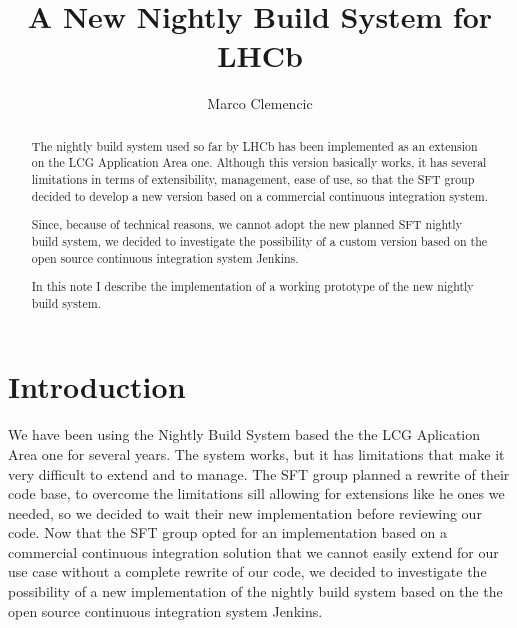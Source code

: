\documentclass{lhcbnote}
\title{A New Nightly Build System for LHCb}
\author{Marco Clemencic\address[MCl]{CERN, Switzerland}}
\begin{document}
\maketitle

\begin{abstract}
The nightly build system used so far by LHCb has been implemented as an
extension on the LCG Application Area one\cite{Kruzelecki:2010zz}.  Although
this version basically works, it has several limitations in terms of
extensibility, management, ease of use, so that the SFT group decided to develop
a new version based on a commercial continuous integration system.

Since, because of technical reasons, we cannot adopt the new planned SFT nightly
build system, we decided to investigate the possibility of a custom version
based on the open source continuous integration system Jenkins\cite{Jenkins}.

In this note I describe the implementation of a working prototype of the new
nightly build system.
\end{abstract}

\begin{status}
\end{status}

\tableofcontents

\listoffigures
\listoftables

\section{Introduction}
We have been using the Nightly Build System based the the LCG Aplication Area
one for several years\cite{Kruzelecki:2010zz}.  The system works, but it has
limitations that make it very difficult to extend and to manage.  The SFT group
planned a rewrite of their code base, to overcome the limitations sill allowing
for extensions like he ones we needed, so we decided to wait their new
implementation before reviewing our code.  Now that the SFT group opted for an
implementation based on a commercial continuous integration solution that we
cannot easily extend for our use case without a complete rewrite of our code, we
decided to investigate the possibility of a new implementation of the nightly
build system based on the the open source continuous integration system
Jenkins\cite{Jenkins}.
\end{document}

